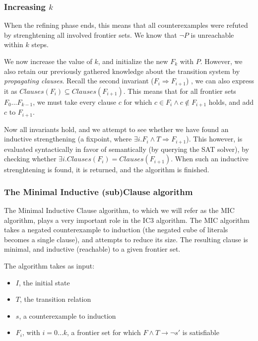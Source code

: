 \documentclass[a4paper]{article}
\begin{document}
\subsubsection{Increasing $k$}
When the refining phase ends, this means that all counterexamples were refuted by strenghtening all involved frontier sets. We know %
that $\lnot P$ is unreachable within $k$ steps.

We now increase the value of $k$, and initialize the new $F_k$ with $P$.
However, we also retain our previously gathered knowledge about the transition system by \emph{propagating clauses}. Recall the second invariant ($F_i \Rightarrow F_{i+1}$) , we can also express it as $Clauses(F_i) \subseteq Clauses(F_{i+1})$. This means that for all frontier sets $F_0 \ldots F_{k-1}$, we must take every clause $c$ for which $c \in F_i \land c\notin F_{i+1}$ holds, and add $c$ to $F_{i+1}$.

Now all invariants hold, and we attempt to see whether we have found an inductive strengthening (a fixpoint, where $\exists i. F_i \land T \Rightarrow F_{i+1}$). This however, is evaluated syntactically in favor of semantically (by querying the SAT solver), by checking whether $\exists i. Clauses(F_i) = Clauses(F_{i+1})$. When such an inductive strenghtening is found, it is returned, and the algorithm is finished.

\subsubsection{The Minimal Inductive (sub)Clause algorithm}
\label{sec:MIC}
The Minimal Inductive Clause algorithm, to which we will refer as the MIC algorithm, plays a very important role in the IC3 algorithm. The MIC algorithm takes a negated counterexample to induction (the negated cube of literals becomes a single clause), and attempts to reduce its size. The resulting clause is minimal, and inductive (reachable) to a given frontier set.

The algorithm takes as input:
\begin{itemize}
\item $I$, the initial state
\item $T$, the transition relation
\item $s$, a counterexample to induction
\item $F_i$, with $i=0 \ldots k$, a frontier set for which $F \land T \rightarrow \lnot s'$ is satisfiable
\end{itemize}
\end{document}
